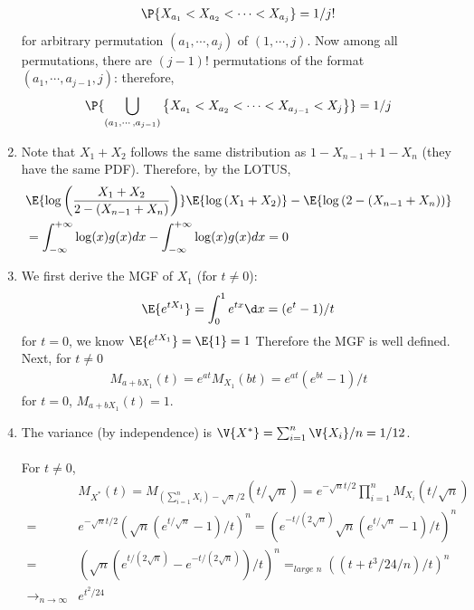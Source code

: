\begin{exercise}
\begin{solution}
\begin{enumerate}
  		\begin{align*}
  			\P{X_{a_1}<X_{a_2}<\cdots < X_{a_j} } =1/j!
  		\end{align*}	
  		for arbitrary permutation $(a_1,\cdots, a_j)$ of $(1,\cdots, j)$. Now among all permutations, there are $(j-1)!$ permutations of the format  $(a_1,\cdots, a_{j-1}, j)$: therefore,
  		\begin{align*}
  		  \P{\bigcup_{(a_1,\cdots, a_{j-1})}\left\{X_{a_1}<X_{a_2}<\cdots < X_{a_{j-1}}<X_j\right\}} =1/j
  		\end{align*}
  	\item 			Note that  $X_1+X_2$ follows the same distribution as $1-X_{n-1}+1-X_n$ (they have the same PDF). Therefore, by the LOTUS, 
  	\begin{align*}
  		&\E{\log\left(\frac{X_1+X_2}{2-(X_{n-1}+X_{n})} \right) }\E{\log\left({X_1+X_2} \right)}- \E{\log\left( {2-(X_{n-1}+X_{n})} \right) } \\&= \int_{-\infty}^{+\infty} \log(x)g(x)dx- \int_{-\infty}^{+\infty} \log(x)g(x)dx =0
  	\end{align*}
  \item 			We first derive the MGF  of $X_1$ (for $t\neq 0$):
  \begin{align*}
  	\E{e^{tX_1}} =\int_{0}^{1} e^{tx} \d x =  (e^t-1)/t
  \end{align*}	
  for $t=0$, we know $	\E{e^{tX_1}}=	\E{1}=1$	
  Therefore the MGF is well defined. Next, for $t\neq 0$ 
  \begin{align*}
  	M_{a+b X_1}(t) = e^{at}M_{X_1}(bt)= e^{at}\left(e^{bt}-1\right)/t
  \end{align*}	
  for $t=0$, $	M_{a+b X_1}(t) = 1$.
  \item 						The variance (by independence) is $\V{X^*}=\sum_{i=1}^n\V{X_i}/n = 1/12$.\\~\\
  For $t\neq 0$,
  \begin{align*}
  	&M_{X^*}(t) = M_{\left(\sum_{i=1}^n X_i\right) -\sqrt{n}/2  }(t/\sqrt{n}) =e^{-\sqrt{n}t/2 }\prod_{i=1}^nM_{ X_i}(t/\sqrt{n})\\
  	=& e^{-\sqrt{n}t/2 } \left(\sqrt{n}\left(e^{t/\sqrt{n}} -1 \right)/t\right)^n= \left(e^{-t/(2\sqrt{n}) }\sqrt{n}\left(e^{t/\sqrt{n}} -1 \right)/t\right)^n\\
  	=&  \left(\sqrt{n}\left(e^{t/(2\sqrt{n})} -e^{-t/(2\sqrt{n}) } \right)/t\right)^n =_{\textit{large n}} \left((t+t^3/24/n)/t\right)^n\\ \rightarrow_{n\rightarrow \infty}& e^{t^2/24}
  \end{align*}	

\end{enumerate}
\end{solution}
\end{exercise}
